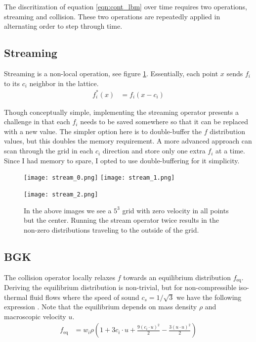 The discritization of equation \ref{eqn:cont_lbm} over time
requires two operations, streaming and collision.
These two operations are repeatedly applied in alternating
order to step through time.

\subsection{Streaming}
Streaming is a non-local operation, see figure \ref{fig:stream_example}. 
Essentially, each point $x$ sends $f_i$ 
to its $c_i$ neighbor in the lattice.
\begin{align*}
  f_i^{*}(x) &= f_i(x - c_i)
\end{align*}

Though conceptually simple, implementing the streaming
operator presents a challenge in that 
each $f_i$ needs to be saved somewhere so that 
it can be replaced with a new value.
The simpler option here is to double-buffer the $f$ distribution
values, but this doubles the memory requirement.
A more advanced approach can scan through the grid in each 
$c_i$ direction and store only one extra $f_i$ at a time.
Since I had memory to spare,
I opted to use double-buffering for it simplicity.

\begin{figure}
  \begin{center}
    \texttt{[image: stream\_0.png]}
    \texttt{[image: stream\_1.png]}

    \texttt{[image: stream\_2.png]}
  \end{center}
  \caption{In the above images we see a $5^3$ grid with zero
  velocity in all points but the center.
Running the stream operator twice results in the 
non-zero distributions traveling to the outside of the grid.}
\label{fig:stream_example}
\end{figure}

\subsection{BGK}
The collision operator locally relaxes $f$ towards
an equilibrium distribution $f_{\text{eq}}$.
Deriving the equilibrium distribution is non-trivial,
but for non-compressible iso-thermal fluid flows
where the speed of sound $c_s = 1 / \sqrt{3}$ we 
have the following expression \cite{Kruger2018}.
Note that the equilibrium depends on mass density $\rho$ and 
macroscopic velocity $u$.
\begin{align*}
   f_{\text{eq}} &= w_i \rho \left(
1 + 3 c_i \cdot u  + \frac{9 (c_i \cdot u)^2}{2}
- \frac{3 (u \cdot u)^2}{2}\right) \\
\end{align*}

